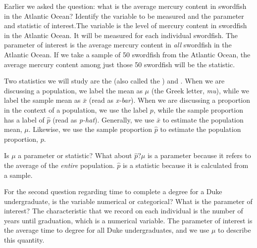 \begin{examplewrap}
\begin{nexample}{Earlier we asked the question: what is the average mercury content in swordfish in the Atlantic Ocean? Identify the variable to be measured and the parameter and statistic of interest.}The variable is the level of mercury content in swordfish in the Atlantic Ocean. It will be measured for each individual swordfish. The parameter of interest is the average mercury content in \emph{all} swordfish in the Atlantic Ocean. If we take a sample of 50 swordfish from the Atlantic Ocean, the average mercury content among just those 50 swordfish will be the statistic.
\end{nexample}
\end{examplewrap}

Two statistics we will study are the  (also called the ) and . When we are discussing a population, we label the mean as $\mu$ (the Greek letter, \emph{mu}), while we label the sample mean as $\bar{x}$ (read as \emph{x-bar}). When we are discussing a proportion in the context of a population, we use the label $p$, while the sample proportion has a label of $\hat{p}$ (read as \emph{p-hat}). Generally, we use $\bar{x}$ to estimate the population mean, $\mu$. Likewise, we use the sample proportion $\hat{p}$ to estimate the population proportion, $p$.


\begin{examplewrap}
\begin{nexample}{Is $\mu$ a parameter or statistic? What about $\hat{p}$?}$\mu$ is a parameter because it refers to the average of the \emph{entire} population. $\hat{p}$ is a statistic because it is calculated from a sample.
\end{nexample}
\end{examplewrap}

\begin{examplewrap}
\begin{nexample}{For the second question regarding time to complete a degree for a Duke undergraduate, is the variable numerical or categorical? What is the parameter of interest?}
The characteristic that we record on each individual is the number of years until graduation, which is a numerical variable. The parameter of interest is the average time to degree for all Duke undergraduates, and we use $\mu$ to describe this quantity.
\end{nexample}
\end{examplewrap}


